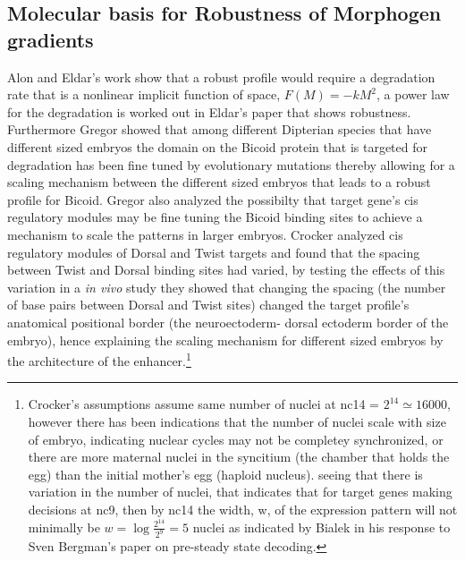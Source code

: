 \subsection{Molecular basis for Robustness of Morphogen gradients}

Alon and Eldar's work show that a robust profile would require a degradation rate that is a nonlinear implicit function of space, $ F(M) = -kM^2$, a power law for the degradation is worked out in Eldar's paper that shows robustness\cite{pmid12239569}.  Furthermore Gregor showed that among different Dipterian species that have different sized embryos the domain on the Bicoid protein that is targeted for degradation has been fine tuned by evolutionary mutations thereby allowing for a scaling mechanism between the different sized embryos that leads to a robust profile for Bicoid.  Gregor also analyzed the possibilty that target gene's cis regulatory modules may be fine tuning the Bicoid binding sites to achieve a mechanism to scale the patterns in larger embryos\cite{pmid16352710}\cite{pmid16352710}.  Crocker analyzed cis regulatory modules of Dorsal and Twist targets and found that the spacing between Twist and Dorsal binding sites had varied, by testing the effects of this variation in a \textit{in vivo} study they showed that changing the spacing (the number of base pairs between Dorsal and Twist sites) changed the target profile's anatomical positional border (the neuroectoderm- dorsal ectoderm border of the embryo), hence explaining the scaling mechanism for different sized embryos by the architecture of the enhancer.\footnote[1]{Crocker's assumptions assume same number of nuclei at nc14 = $2^{14} \simeq 16000$, however there has been indications that the number of nuclei scale with size of embryo, indicating nuclear cycles may not be completey synchronized, or there are more maternal nuclei in the syncitium (the chamber that holds the egg) than the initial mother's egg (haploid nucleus).\cite{kreitman} seeing that there is variation in the number of nuclei, that indicates that for target genes making decisions at nc9, then by nc14 the width, w, of the expression pattern will not minimally be $w = \log{\frac{2^{14}}{2^9}} =5 $ nuclei as indicated by Bialek in his response to Sven Bergman's paper on pre-steady state decoding\cite{Response}\cite{pmid17298180}. } 